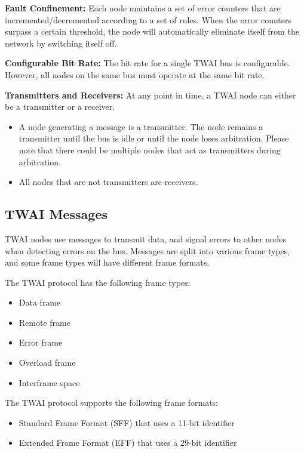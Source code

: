 \documentclass[main\_\_EN.tex]{subfiles}
\begin{document}
{\bfseries Fault Confinement:} Each node maintains a set of error counters that are incremented/decremented according to a set of rules. When the error counters surpass a certain threshold, the node will automatically eliminate itself from the network by switching itself off.

{\bfseries 
Configurable Bit Rate:} The bit rate for a single TWAI bus is configurable. However, all nodes on the same bus must operate at the same bit rate.

{\bfseries Transmitters and Receivers:} At any point in time, a TWAI node can either be a transmitter or a receiver.
\begin{itemize}
    \item A node generating a message is a transmitter. The node remains a transmitter until the bus is idle or until the node loses arbitration. Please note that there could be multiple nodes that act as transmitters during arbitration.
    \item All nodes that are not transmitters are receivers.
\end{itemize}

\subsection{TWAI Messages}
\label{sec:twai-messages}

TWAI nodes use messages to transmit data, and signal errors to other nodes when detecting errors on the bus. Messages are split into various frame types, and some frame types will have different frame formats. 

The TWAI protocol has the following frame types:

\begin{itemize}
    \item Data frame
    \item Remote frame
    \item Error frame
    \item Overload frame
    \item Interframe space
\end{itemize}

The TWAI protocol supports the following frame formats:

\begin{itemize}
    \item Standard Frame Format (SFF) that uses a 11-bit identifier
    \item Extended Frame Format (EFF) that uses a 29-bit identifier
\end{itemize}
\end{document}
